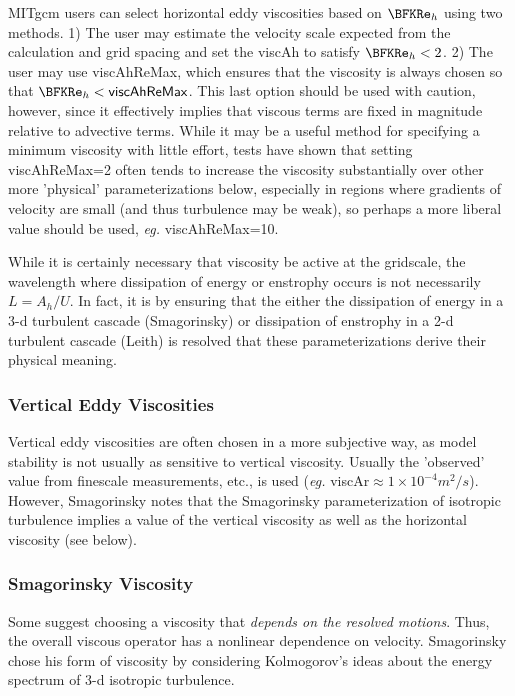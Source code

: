 MITgcm users can select horizontal eddy viscosities based on
$\BFKRe_h$ using two methods.  1) The user may estimate the velocity
scale expected from the calculation and grid spacing and set the {\sf
  viscAh} to satisfy $\BFKRe_h<2$.  2) The user may use {\sf
  viscAhReMax}, which ensures that the viscosity is always chosen so
that $\BFKRe_h<{\sf viscAhReMax}$.  This last option should be used
with caution, however, since it effectively implies that viscous terms
are fixed in magnitude relative to advective terms.  While it may be a
useful method for specifying a minimum viscosity with little effort,
tests \cite{Bryanetal75} have shown that setting {\sf viscAhReMax}=2
often tends to increase the viscosity substantially over other more
'physical' parameterizations below, especially in regions where
gradients of velocity are small (and thus turbulence may be weak), so
perhaps a more liberal value should be used, \textit{eg.} {\sf
  viscAhReMax}=10.
  
While it is certainly necessary that viscosity be active at the
gridscale, the wavelength where dissipation of energy or enstrophy
occurs is not necessarily $L=A_h/U$.  In fact, it is by ensuring that
the either the dissipation of energy in a 3-d turbulent cascade
(Smagorinsky) or dissipation of enstrophy in a 2-d turbulent cascade
(Leith) is resolved that these parameterizations derive their physical
meaning.
  
\subsubsection{Vertical Eddy Viscosities}
Vertical eddy viscosities are often chosen in a more subjective way,
as model stability is not usually as sensitive to vertical viscosity.
Usually the 'observed' value from finescale measurements, etc., is
used (\textit{eg.} {\sf viscAr}$\approx1\times10^{-4} m^2/s$).  However,
Smagorinsky \cite{Smagorinsky93} notes that the Smagorinsky
parameterization of isotropic turbulence implies a value of the
vertical viscosity as well as the horizontal viscosity (see below).
 
\subsubsection{Smagorinsky Viscosity}
Some \cite{sm63,Smagorinsky93} suggest choosing a viscosity
that \emph{depends on the resolved motions}.  Thus, the overall
viscous operator has a nonlinear dependence on velocity.  Smagorinsky
chose his form of viscosity by considering Kolmogorov's ideas about
the energy spectrum of 3-d isotropic turbulence.

